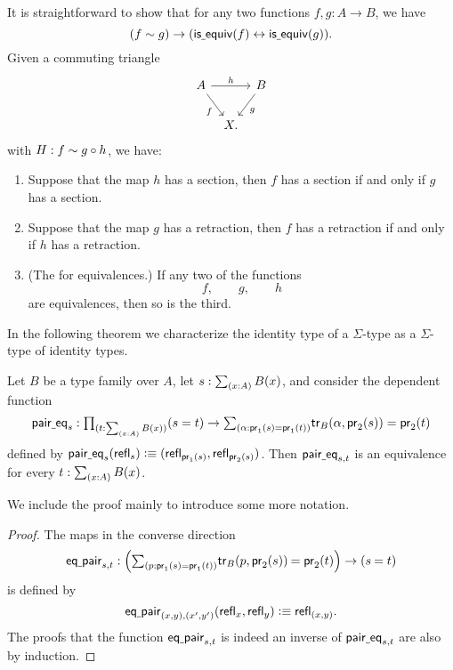 It is straightforward to show that for any two functions $f,g:A\to B$, we have
\begin{equation*}
(f\sim g)\to (\mathsf{is\underline{\ }{}equiv}(f)\leftrightarrow\mathsf{is\underline{\ }{}equiv}(g)).
\end{equation*}
Given a commuting triangle
\begin{equation*}
\begin{tikzcd}[column sep=tiny]
A \arrow[rr,"h"] \arrow[dr,swap,"f"] & & B \arrow[dl,"g"] \\
& X.
\end{tikzcd}
\end{equation*}
with $H:f\sim g\circ h$, we have:
\begin{enumerate}
\item Suppose that the map $h$ has a section, then $f$ has a section if and only if $g$ has a section.
\item Suppose that the map $g$ has a retraction, then $f$ has a retraction if and only if $h$ has a retraction.
\item (The  for equivalences.) If any two of the functions
\begin{equation*}
f,\qquad g,\qquad h
\end{equation*}
are equivalences, then so is the third.
\end{enumerate}

In the following theorem we characterize the identity type of a $\Sigma$-type as a $\Sigma$-type of identity types.


\begin{prp}\label{thm:eq_sigma}
Let $B$ be a type family over $A$, let $s:\sm{x:A}B(x)$, and consider the dependent function
\begin{equation*}
\paireq_s:\prd{t:\sm{x:A}B(x)} (s=t)\to \sm{\alpha:\proj 1(s)=\proj 1(t)} \tr_B(\alpha,\proj 2(s))=\proj 2(t)
\end{equation*}
defined by $\mathsf{pair\underline{\ }{}eq}_s(\mathsf{refl}_{s}) \vcentcolon\equiv (\mathsf{refl}_{\mathsf{pr}_{1}(s)},\mathsf{refl}_{\mathsf{pr}_{2}(s)})$. Then $\mathsf{pair\underline{\ }{}eq}_{s,t}$ is an equivalence for every $t:\sm{x:A}B(x)$.
\end{prp}

We include the proof mainly to introduce some more notation.

\begin{proof}
The maps in the converse direction
\begin{equation*}
\eqpair_{s,t} : \Big(\sm{p:\proj 1(s)=\proj 1(t)}\id{\tr_B(p,\proj 2(s))}{\proj 2(t)}\Big)\to(\id{s}{t})
\end{equation*}
is defined by
\begin{equation*}
\mathsf{eq\underline{\ }{}pair}_{(x,y),(x',y')}(\mathsf{refl}_{x},\mathsf{refl}_{y})\vcentcolon\equiv \mathsf{refl}_{(x,y)}.
\end{equation*}
The proofs that the function $\mathsf{eq\underline{\ }{}pair}_{s,t}$ is indeed an inverse of $\mathsf{pair\underline{\ }{}eq}_{s,t}$ are also by induction.
\end{proof}

